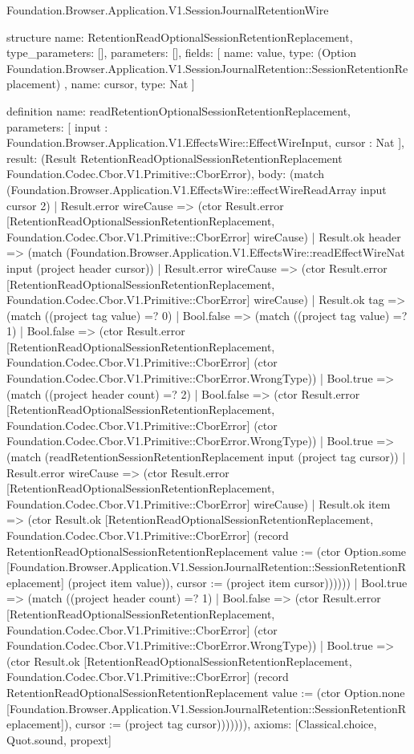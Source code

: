 \begin{lexlean}{Foundation.Browser.Application.V1.SessionJournalRetentionWire}
\begin{semanticmodule}
structure{
  name: RetentionReadOptionalSessionRetentionReplacement,
  type_parameters: [],
  parameters: [],
  fields: [
    {
      name: value,
      type: (Option Foundation.Browser.Application.V1.SessionJournalRetention::SessionRetentionReplacement)
    },
    {name: cursor, type: Nat}
  ]
}

definition{
  name: readRetentionOptionalSessionRetentionReplacement,
  parameters: [
    input : Foundation.Browser.Application.V1.EffectsWire::EffectWireInput,
    cursor : Nat
  ],
  result: (Result RetentionReadOptionalSessionRetentionReplacement Foundation.Codec.Cbor.V1.Primitive::CborError),
  body: (match (Foundation.Browser.Application.V1.EffectsWire::effectWireReadArray input cursor 2)
    | Result.error wireCause => (ctor Result.error [RetentionReadOptionalSessionRetentionReplacement, Foundation.Codec.Cbor.V1.Primitive::CborError] wireCause)
    | Result.ok header => (match (Foundation.Browser.Application.V1.EffectsWire::readEffectWireNat input (project header cursor))
      | Result.error wireCause => (ctor Result.error [RetentionReadOptionalSessionRetentionReplacement, Foundation.Codec.Cbor.V1.Primitive::CborError] wireCause)
      | Result.ok tag => (match ((project tag value) =? 0)
        | Bool.false => (match ((project tag value) =? 1)
          | Bool.false => (ctor Result.error [RetentionReadOptionalSessionRetentionReplacement, Foundation.Codec.Cbor.V1.Primitive::CborError] (ctor Foundation.Codec.Cbor.V1.Primitive::CborError.WrongType))
          | Bool.true => (match ((project header count) =? 2)
            | Bool.false => (ctor Result.error [RetentionReadOptionalSessionRetentionReplacement, Foundation.Codec.Cbor.V1.Primitive::CborError] (ctor Foundation.Codec.Cbor.V1.Primitive::CborError.WrongType))
            | Bool.true => (match (readRetentionSessionRetentionReplacement input (project tag cursor))
              | Result.error wireCause => (ctor Result.error [RetentionReadOptionalSessionRetentionReplacement, Foundation.Codec.Cbor.V1.Primitive::CborError] wireCause)
              | Result.ok item => (ctor Result.ok [RetentionReadOptionalSessionRetentionReplacement, Foundation.Codec.Cbor.V1.Primitive::CborError] (record RetentionReadOptionalSessionRetentionReplacement {value := (ctor Option.some [Foundation.Browser.Application.V1.SessionJournalRetention::SessionRetentionReplacement] (project item value)), cursor := (project item cursor)})))))
        | Bool.true => (match ((project header count) =? 1)
          | Bool.false => (ctor Result.error [RetentionReadOptionalSessionRetentionReplacement, Foundation.Codec.Cbor.V1.Primitive::CborError] (ctor Foundation.Codec.Cbor.V1.Primitive::CborError.WrongType))
          | Bool.true => (ctor Result.ok [RetentionReadOptionalSessionRetentionReplacement, Foundation.Codec.Cbor.V1.Primitive::CborError] (record RetentionReadOptionalSessionRetentionReplacement {value := (ctor Option.none [Foundation.Browser.Application.V1.SessionJournalRetention::SessionRetentionReplacement]), cursor := (project tag cursor)})))))),
  axioms: [Classical.choice, Quot.sound, propext]
}


\end{semanticmodule}
\end{lexlean}
